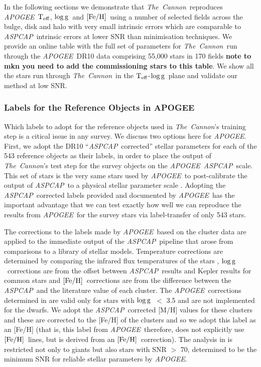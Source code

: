 \documentclass[12pt, preprint]{aastex}
\newcommand{\teff}{\mbox{$\rm T_{eff}$}}
\newcommand{\feh}{\mbox{$\rm [Fe/H]$}}
\newcommand{\logg}{\mbox{$\rm \log g$}}
\newcommand{\tc}{\textsl{The~Cannon}}
\newcommand{\apogee}{\textsl{APOGEE}}
\newcommand{\aspcap}{\textsl{ASPCAP}}
\begin{document}

In the following sections we demonstrate that \tc\ reproduces \apogee\ \teff, \logg\ and \feh\ using a number of selected fields across the bulge, disk and halo with very small intrinsic errors which are comparable to \aspcap\ intrinsic errors at lower SNR than minimisation techniques. 
We provide an online table with the full set of parameters for \tc\ run through the \apogee\ DR10 data comprising 55,000 stars in 170 fields \textbf{note to mkn you need to add the commissioning stars to this table}.  
We show all the stars run through \tc\ in the \teff-\logg\ plane and validate our method at low SNR.

\subsubsection{Labels for the Reference Objects in APOGEE}
\label{sec:ApogeeRefLabels}

Which labels to adopt for the reference objects used in \tc 's training step is a citical issue
in any survey. We discuss two options here for \apogee . 
First, we adopt the DR10 ``\aspcap\ corrected'' stellar parameters for each of the 543 reference objects as their labels, in order to place the output of \tc 's test step for the survey objects on the \apogee\ \aspcap\ scale.
 This set of stars is the very same stars used by \apogee\ to post-calibrate the output of \aspcap\ to a physical stellar parameter scale \citep{Meszaros2013}.
Adopting the \aspcap\ corrected labels provided and documented by \apogee\ has the important advantage 
that we can test exactly how well we can reproduce the results from \apogee\ for the survey stars via label-transfer of only 543 stars.

The corrections to the labels made by \apogee\ based on the cluster data are applied to the immediate output of the \aspcap\ pipeline that arose from comparisons to a library of stellar models.
Temperature corrections are determined by comparing the infrared flux temperatures of the stars \citep{gonzalez2009}, \logg\ corrections are from the offset between \aspcap\ results and Kepler results for common stars and \feh\ corrections are from the difference between the \aspcap\ and  the literature value of each cluster.  
The \apogee\ corrections determined in \citet{Meszaros2013} are valid only for stars with \logg\ $<$ 3.5 and are not implemented for the dwarfs.  We adopt the \aspcap\ corrected [M/H] values for these clusters and these are corrected to the [Fe/H] of the clusters and so we adopt this label as an [Fe/H] (that is, this label from \apogee\ therefore, does not explicitly use \feh\ lines, but is derived from an \feh\ correction). 
The analysis in \citet{Meszaros2013} is restricted not only to giants but also stars with SNR $>$ 70, determined to be the minimum SNR for reliable stellar parameters by \apogee.
\end{document}
